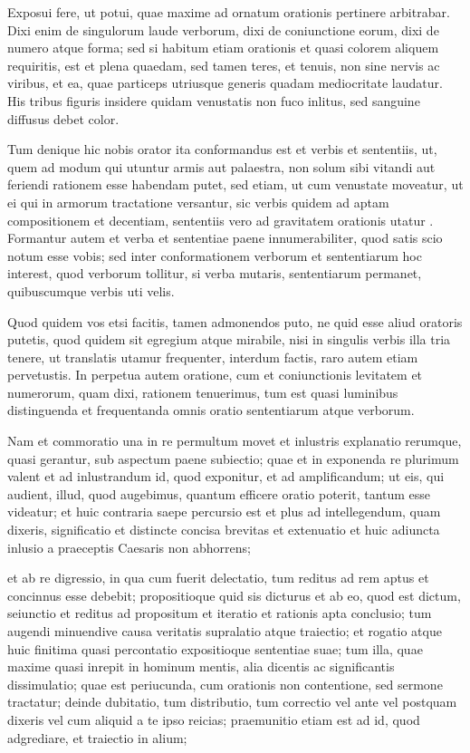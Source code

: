  Exposui fere, ut potui, quae maxime ad ornatum orationis pertinere arbitrabar. Dixi enim de singulorum laude verborum, dixi de coniunctione eorum, dixi de numero atque forma; sed si habitum etiam orationis et quasi colorem aliquem requiritis, est et plena quaedam, sed tamen teres, et tenuis, non sine nervis ac viribus, et ea, quae particeps utriusque generis quadam mediocritate laudatur. His tribus figuris insidere quidam venustatis non fuco inlitus, sed sanguine diffusus debet color.

 Tum denique hic nobis orator ita conformandus est et verbis et sententiis, ut, quem ad modum qui utuntur armis aut palaestra, non solum sibi vitandi aut feriendi rationem esse habendam putet, sed etiam, ut cum venustate moveatur, ut ei qui in armorum tractatione versantur, sic verbis quidem ad aptam compositionem et decentiam, sententiis vero ad gravitatem orationis utatur . Formantur autem et verba et sententiae paene innumerabiliter, quod satis scio notum esse vobis; sed inter conformationem verborum et sententiarum hoc interest, quod verborum tollitur, si verba mutaris, sententiarum permanet, quibuscumque verbis uti velis.

 Quod quidem vos etsi facitis, tamen admonendos puto, ne quid esse aliud oratoris putetis, quod quidem sit egregium atque mirabile, nisi in singulis verbis illa tria tenere, ut translatis utamur frequenter, interdum factis, raro autem etiam pervetustis. In perpetua autem oratione, cum et coniunctionis levitatem et numerorum, quam dixi, rationem tenuerimus, tum est quasi luminibus distinguenda et frequentanda omnis oratio sententiarum atque verborum.

 Nam et commoratio una in re permultum movet et inlustris explanatio rerumque, quasi gerantur, sub aspectum paene subiectio; quae et in exponenda re plurimum valent et ad inlustrandum id, quod exponitur, et ad amplificandum; ut eis, qui audient, illud, quod augebimus, quantum efficere oratio poterit, tantum esse videatur; et huic contraria saepe percursio est et plus ad intellegendum, quam dixeris, significatio et distincte concisa brevitas et extenuatio et huic adiuncta inlusio a praeceptis Caesaris non abhorrens;

 et ab re digressio, in qua cum fuerit delectatio, tum reditus ad rem aptus et concinnus esse debebit; propositioque quid sis dicturus et ab eo, quod est dictum, seiunctio et reditus ad propositum et iteratio et rationis apta conclusio; tum augendi minuendive causa veritatis supralatio atque traiectio; et rogatio atque huic finitima quasi percontatio expositioque sententiae suae; tum illa, quae maxime quasi inrepit in hominum mentis, alia dicentis ac significantis dissimulatio; quae est periucunda, cum orationis non contentione, sed sermone tractatur; deinde dubitatio, tum distributio, tum correctio vel ante vel postquam dixeris vel cum aliquid a te ipso reicias; praemunitio etiam est ad id, quod adgrediare, et traiectio in alium;

